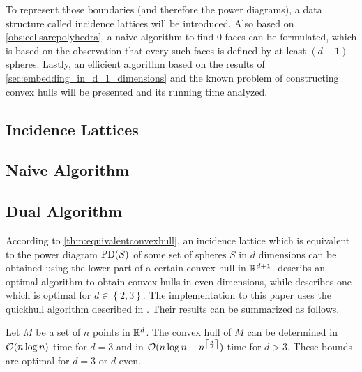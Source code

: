 To represent those boundaries (and therefore the power diagrams), a data structure called incidence lattices will be introduced.
Also based on \cref{obs:cellsarepolyhedra}, a naive algorithm to find $0$-faces can be formulated, which is based on the observation that every such faces is defined by at least $(d+1)$ spheres.
Lastly, an efficient algorithm based on the results of \cref{sec:embedding_in_d_1_dimensions} and the known problem of constructing convex hulls will be presented and its running time analyzed.

\subsection{Incidence Lattices}
\label{sub:incidence_lattices}

\subsection{Naive Algorithm}
\label{sub:naive_algorithm}

\subsection{Dual Algorithm}
\label{sub:dual_algorithm}
According to \cref{thm:equivalentconvexhull}, an incidence lattice which is equivalent to the power diagram $\operatorname{PD}(S)$ of some set of spheres $S$ in $d$ dimensions can be obtained using the lower part of a certain convex hull in $\mathbb{R}^{d+1}$.
\cite{seidel1981convex} describs an optimal algorithm to obtain convex hulls in even dimensions, while \cite{preparata1977convex} describes one which is optimal for $d \in \left\{ 2, 3 \right\}$.
The implementation to this paper uses the quickhull algorithm described in \cite{barber1996quickhull}.
Their results can be summarized as follows.
\begin{lemma}
    \label{lem:convexhulls}
    Let $M$ be a set of $n$ points in $\mathbb{R}^d$.
    The convex hull of $M$ can be determined in $\mathcal{O}(n \log n)$ time for $d = 3$ and in $\mathcal{O}(n \log n + n^{\left\lceil\frac{d}{2}\right\rceil})$ time for $d > 3$.
    These bounds are optimal for $d = 3$ or $d$ even.
\end{lemma}

